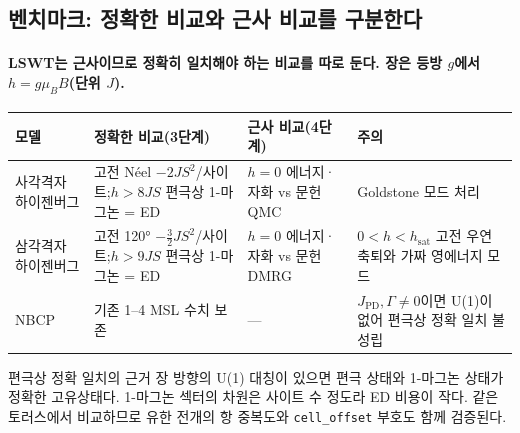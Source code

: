 \subsection{벤치마크: 정확한 비교와 근사 비교를 구분한다}\label{benchmarks}
\begingroup%
  \framesubtitle{LSWT는 근사이므로 정확히 일치해야 하는 비교를 따로 둔다. 장은 등방 $g$에서 $h=g\mu_B B$(단위 $J$).}
  \small
  \begin{tabularx}{\textwidth}{@{}P{2.1cm}P{4.4cm}P{3.0cm}Y@{}}
    \toprule
    모델 & 정확한 비교(3단계) & 근사 비교(4단계) & 주의 \\
    \midrule
    사각격자 하이젠버그 & 고전 Néel $-2JS^2$/사이트;\newline $h>8JS$ 편극상 1-마그논 = ED
      & $h=0$ 에너지·자화 vs 문헌 QMC & Goldstone 모드 처리 \\
    삼각격자 하이젠버그 & 고전 120° $-\tfrac32JS^2$/사이트;\newline $h>9JS$ 편극상 1-마그논 = ED
      & $h=0$ 에너지·자화 vs 문헌 DMRG & $0<h<h_{\mathrm{sat}}$ 고전 우연 축퇴와 가짜 영에너지 모드 \\
    NBCP & 기존 1--4 MSL 수치 보존 & — & $J_{\mathrm{PD}},\Gamma\neq0$이면 U(1)이 없어 편극상 정확 일치 불성립 \\
    \bottomrule
  \end{tabularx}
  \par\medskip
  \begin{mdcallout}[result]{편극상 정확 일치의 근거}
    장 방향의 U(1) 대칭이 있으면 편극 상태와 1-마그논 상태가 정확한 고유상태다.
    1-마그논 섹터의 차원은 사이트 수 정도라 ED 비용이 작다. 같은 토러스에서 비교하므로
    유한 전개의 항 중복도와 \texttt{cell\_offset} 부호도 함께 검증된다.
  \end{mdcallout}
\endgroup


